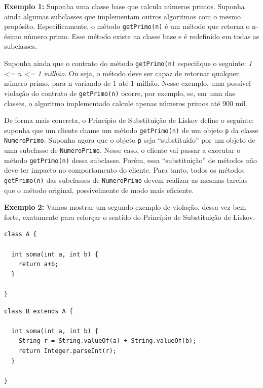 \documentclass[
  11pt,
  twoside]{book}
\newcommand{\passthrough}[1]{#1}
\begin{document}
\textbf{Exemplo 1:} Suponha uma classe base que calcula números primos.
Suponha ainda algumas subclasses que implementam outros algoritmos com o
mesmo propósito. Especificamente, o método
\passthrough{\lstinline!getPrimo(n)!} é um método que retorna o n-ésimo
número primo. Esse método existe na classe base e é redefinido em todas
as subclasses.

Suponha ainda que o contrato do método
\passthrough{\lstinline!getPrimo(n)!} especifique o seguinte: \emph{1
\textless= n \textless= 1 milhão}. Ou seja, o método deve ser capaz de
retornar qualquer número primo, para n variando de 1 até 1 milhão. Nesse
exemplo, uma possível violação do contrato de
\passthrough{\lstinline!getPrimo(n)!} ocorre, por exemplo, se, em uma
das classes, o algoritmo implementado calcule apenas números primos até
900 mil.

De forma mais concreta, o Princípio de Substituição de Liskov define o
seguinte: suponha que um cliente chame um método
\passthrough{\lstinline!getPrimo(n)!} de um objeto
\passthrough{\lstinline!p!} da classe
\passthrough{\lstinline!NumeroPrimo!}. Suponha agora que o objeto
\passthrough{\lstinline!p!} seja ``substituído'' por um objeto de uma
subclasse de \passthrough{\lstinline!NumeroPrimo!}. Nesse caso, o
cliente vai passar a executar o método
\passthrough{\lstinline!getPrimo(n)!} dessa subclasse. Porém, essa
``substituição'' de métodos não deve ter impacto no comportamento do
cliente. Para tanto, todos os métodos
\passthrough{\lstinline!getPrimo(n)!} das subclasses de
\passthrough{\lstinline!NumeroPrimo!} devem realizar as mesmas tarefas
que o método original, possivelmente de modo mais eficiente.

\textbf{Exemplo 2:} Vamos mostrar um segundo exemplo de violação, dessa
vez bem forte, exatamente para reforçar o sentido do Princípio de
Substituição de Liskov.

\begin{lstlisting}
class A {

  int soma(int a, int b) {
    return a+b;
  }

}
\end{lstlisting}

\begin{lstlisting}
class B extends A {

  int soma(int a, int b) {
    String r = String.valueOf(a) + String.valueOf(b);
    return Integer.parseInt(r);
  }

}
\end{lstlisting}
\end{document}

